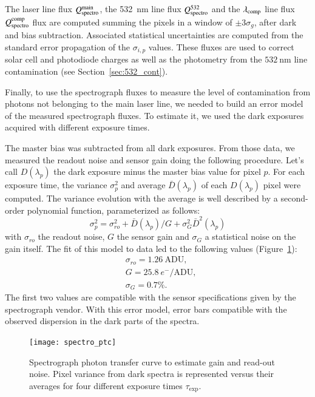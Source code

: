 The laser line flux $Q_{\mathrm{spectro}}^{\mathrm{main}}$, the \SI{532}{\nm} line flux $Q_{\mathrm{spectro}}^{532}$ and the $\lambda_{\rm comp}$ line flux $Q_{\mathrm{spectro}}^{\rm comp}$ flux are computed summing the pixels in a window of $\pm 3 \sigma_g$, after dark and bias subtraction. Associated statistical uncertainties are computed from the standard error propagation of the $\sigma_{i,p}$ values. These fluxes are used to correct solar cell and photodiode charges as well as the \SD photometry from the $\SI{532}{\nm}$ line contamination (see Section~\ref{sec:532_cont}).  %

 
Finally, to use the spectrograph fluxes to measure the level of contamination from photons not belonging to the main laser line, we needed to build an error model of the measured spectrograph fluxes. To estimate it, we used the dark exposures acquired with different exposure times.

The master bias was subtracted from all dark exposures. From those data, we measured the readout noise and sensor gain doing the following procedure. Let's call $D(\lambda_p)$ the dark exposure minus the master bias value for pixel $p$. For each exposure time, the variance $\sigma_p^2$ and average $\bar{D}(\lambda_p)$ of each $D(\lambda_p)$ pixel were computed. The variance evolution with the average is well described by a second-order polynomial function, parameterized as follows:
\begin{equation}\label{eq:spectro_error_model}
\sigma^2_p =\sigma_{ro}^2 +  \bar{D}(\lambda_p)/G + \sigma_G^2 \bar{D}^2(\lambda_p)
\end{equation}
with $\sigma_{ro}$ the readout noise, $G$ the sensor gain and $\sigma_G$ a statistical noise on the gain itself. The fit of this model to data led to the following values (Figure~\ref{fig:spectro_ptc}):
\begin{align}
    & \sigma_{ro} = 1.26\ \mathrm{ADU}, \\
    & G = 25.8\ e^-/\mathrm{ADU} ,\\
    & \sigma_G = 0.7\%.
\end{align}
The first two values are compatible with the sensor specifications given by the spectrograph vendor. 
With this error model, error bars compatible with the observed dispersion in the dark parts of the spectra. 

\begin{figure}[!h]
\centering
\texttt{[image: spectro\_ptc]}
\caption{Spectrograph photon transfer curve to estimate gain and read-out noise. Pixel variance from dark spectra is represented versus their averages for four different exposure times $\tau_{\mathrm{exp}}$.}\label{fig:spectro_ptc}
\end{figure}





